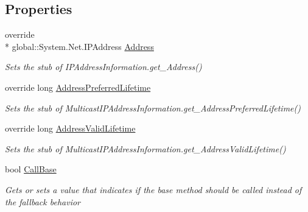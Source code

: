 \subsection*{Properties}
\begin{DoxyCompactItemize}
\item 
override \\*
global\-::\-System.\-Net.\-I\-P\-Address \hyperlink{class_system_1_1_net_1_1_network_information_1_1_fakes_1_1_stub_multicast_i_p_address_information_a29125a43242aa4421e59f5ac2e7a1e01}{Address}
\begin{DoxyCompactList}\small\item\em Sets the stub of I\-P\-Address\-Information.\-get\-\_\-\-Address()\end{DoxyCompactList}\item 
override long \hyperlink{class_system_1_1_net_1_1_network_information_1_1_fakes_1_1_stub_multicast_i_p_address_information_ad01afece4719458dd3406b3ea0f94cf9}{Address\-Preferred\-Lifetime}
\begin{DoxyCompactList}\small\item\em Sets the stub of Multicast\-I\-P\-Address\-Information.\-get\-\_\-\-Address\-Preferred\-Lifetime()\end{DoxyCompactList}\item 
override long \hyperlink{class_system_1_1_net_1_1_network_information_1_1_fakes_1_1_stub_multicast_i_p_address_information_a08c2805c9dc550be761f7e4fab4e9aa3}{Address\-Valid\-Lifetime}
\begin{DoxyCompactList}\small\item\em Sets the stub of Multicast\-I\-P\-Address\-Information.\-get\-\_\-\-Address\-Valid\-Lifetime()\end{DoxyCompactList}\item 
bool \hyperlink{class_system_1_1_net_1_1_network_information_1_1_fakes_1_1_stub_multicast_i_p_address_information_ae23ad75a81dfe6dc456915eb8ca9d070}{Call\-Base}
\begin{DoxyCompactList}\small\item\em Gets or sets a value that indicates if the base method should be called instead of the fallback behavior\end{DoxyCompactList}\item 

\end{DoxyCompactItemize}

